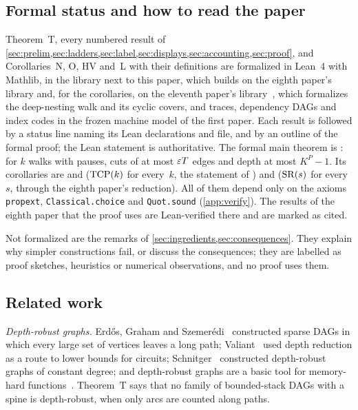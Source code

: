 \subsection{Formal status and how to read the paper}

Theorem~T, every numbered result of \cref{sec:prelim,sec:ladders,sec:label,sec:displays,sec:accounting,sec:proof}, and
Corollaries~N, O, HV and~L with their definitions are formalized in Lean~4 with Mathlib, in the library
 next to this paper, which builds on the eighth paper's library and, for the corollaries, on the
eleventh paper's library~\cite{MergeDepth2026}, which formalizes the deep-nesting walk and its cyclic covers, and traces,
dependency DAGs and index codes in the frozen machine model of the first paper. Each result is followed by a status line naming its Lean declarations and file, and by an outline of the
formal proof; the Lean statement is authoritative. The formal main theorem is : for $k$ walks with
pauses, cuts of at most $\varepsilon T$ edges and depth at most $K^P-1$. Its corollaries are  and  ($\mathrm{TCP}(k)$ for
every~$k$, the statement  of ) and  ($\mathrm{SR}(s)$ for every~$s$, through the
eighth paper's reduction). All of them depend only on the axioms \texttt{propext}, \texttt{Classical.choice} and \texttt{Quot.sound} (\cref{app:verify}). The
results of the eighth paper that the proof uses are Lean-verified there and are marked as cited.

Not formalized are the remarks of \cref{sec:ingredients,sec:consequences}. They explain why simpler constructions fail, or
discuss the consequences; they are labelled as proof sketches, heuristics or numerical observations, and no proof uses them.

\subsection{Related work}

\emph{Depth-robust graphs.} Erd\H{o}s, Graham and Szemer\'edi~\cite{EGS1975} constructed sparse DAGs in which every large set of
vertices leaves a long path; Valiant~\cite{Valiant1977} used depth reduction as a route to lower bounds for circuits;
Schnitger~\cite{Schnitger1983} constructed depth-robust graphs of constant degree; and depth-robust graphs are a basic tool for
memory-hard functions~\cite{ABP2017}. Theorem~T says that no family of bounded-stack DAGs with a spine is depth-robust, when
only arcs are counted along paths.


